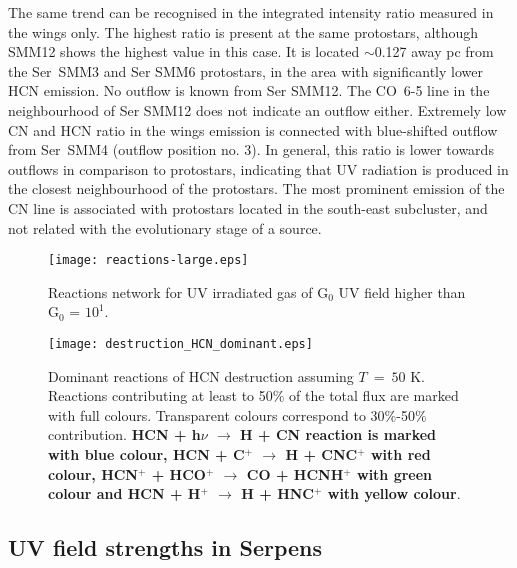 \documentclass{aa}
\begin{document}
The same trend can be recognised in the integrated intensity ratio measured in the wings only. The highest ratio is present at the same protostars, although SMM12 shows the highest value in this case. It is located $\sim$0.127 away pc from the Ser~SMM3 and Ser SMM6 protostars, in the area with significantly lower HCN emission. No outflow is known from Ser SMM12. The \mbox{CO 6-5} line in the neighbourhood of Ser SMM12 does not indicate an outflow either. Extremely low CN and HCN ratio in the wings emission is connected with blue-shifted outflow from Ser~SMM4 (outflow position no. 3). In general, this ratio is lower towards outflows in comparison to protostars, indicating that UV radiation is produced in the closest neighbourhood of the protostars. The most prominent emission of the CN line is associated with protostars located in the south-east subcluster, and not related with the evolutionary stage of a source.

\begin{figure} 
\texttt{[image: reactions-large.eps]} 
\caption{Reactions network for UV irradiated gas of G$_0$ UV field higher than G$_0$ = $10^{1}$.}
\label{reactions_largeG0} 
\end{figure}
\begin{figure} 
\texttt{[image: destruction\_HCN\_dominant.eps]} 
\caption{Dominant reactions
of HCN destruction assuming $T~=~50$ K. Reactions contributing at least to 50$\%$ of the total flux are marked with full colours.
Transparent colours correspond to 30$\%$-50$\%$ contribution. \textbf{HCN + h$\nu$ $\rightarrow$ H + CN reaction is marked with blue colour, HCN + C$^+$ $\rightarrow$ H + CNC$^+$ with red colour, HCN$^+$ + HCO$^+$ $\rightarrow$ CO + HCNH$^+$ with green colour and HCN + H$^+$ $\rightarrow$ H + HNC$^+$ with yellow colour}.} 
\label{HCN_dest} 
\end{figure}
\subsection{UV field strengths in Serpens}
\label{subsection:UV}
\end{document}
